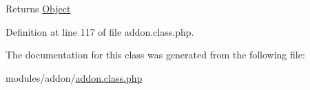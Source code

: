 \begin{DoxyReturn}{Returns}
\hyperlink{classObject}{Object} 
\end{DoxyReturn}


Definition at line 117 of file addon.\-class.\-php.



The documentation for this class was generated from the following file\-:\begin{DoxyCompactItemize}
\item 
modules/addon/\hyperlink{addon_8class_8php}{addon.\-class.\-php}\end{DoxyCompactItemize}
